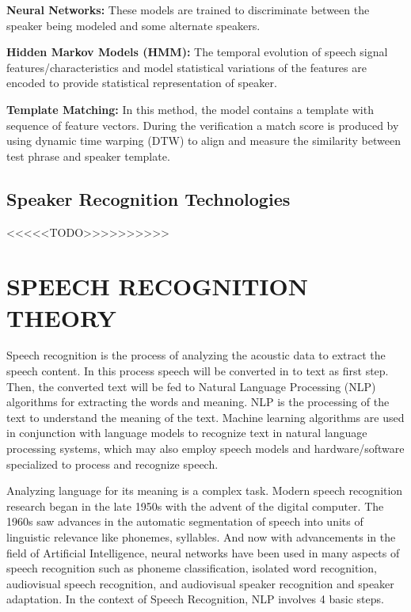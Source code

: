 \documentclass[sigconf]{acmart}
\begin{document}
   \textbf{Neural Networks:} These models are trained to discriminate between the speaker being
modeled and some alternate speakers.

    \textbf{Hidden Markov Models (HMM):}  The temporal evolution of speech signal
features/characteristics and model statistical variations of the features are encoded to provide statistical representation of speaker.

    \textbf{Template Matching:} In this method, the model contains a template with sequence of 
feature vectors. During the verification a match score is produced by using dynamic time warping (DTW) to align and measure the similarity between test phrase and speaker template.

\subsection{Speaker Recognition Technologies} 

<<<<<TODO>>>>>>>>>>

\section{SPEECH RECOGNITION THEORY}
Speech recognition is the process of analyzing the acoustic data to extract the speech content. In this process speech will be converted in to text as first step. Then, the converted text will be fed to Natural Language Processing (NLP) algorithms for extracting the words and meaning. NLP is the processing of the text to understand the meaning of the text. Machine learning algorithms are used in conjunction with language models to recognize text in natural language processing systems, which may also employ speech models and hardware/software specialized to process and recognize speech. 

Analyzing language for its meaning is a complex task. Modern speech recognition research began in the late 1950s with the advent of the digital computer. The 1960s saw advances in the automatic segmentation of speech into units of linguistic relevance like phonemes, syllables. And now with advancements in the field of Artificial Intelligence, neural networks have been used in many aspects of speech recognition such as phoneme classification, isolated word recognition, audiovisual speech recognition, and audiovisual speaker recognition and speaker adaptation. In the context of Speech Recognition, NLP involves 4 basic steps.
\end{document}
